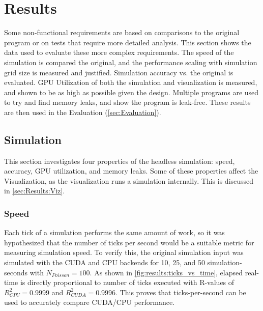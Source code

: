 
\newcommand{\npoisson}{N_{Poisson}}

\chapter{Results}\label{sec:Results}
Some non-functional requirements are based on comparisons to the original program or on tests that require more detailed analysis.
This section shows the data used to evaluate these more complex requirements.
The speed of the simulation is compared the original, and the performance scaling with simulation grid size is measured and justified.
Simulation accuracy vs. the original is evaluated.
GPU Utilization of both the simulation and visualization is measured, and shown to be as high as possible given the design.
Multiple programs are used to try and find memory leaks, and show the program is leak-free.
These results are then used in the Evaluation (\cref{sec:Evaluation}).

\pagebreak
\section{Simulation}
This section investigates four properties of the headless simulation: speed, accuracy, GPU utilization, and memory leaks.
Some of these properties affect the Visualization, as the visualization runs a simulation internally.
This is discussed in \cref{sec:Results:Viz}.

\subsection{Speed}\label{sec:Results:Sim:Speed}



Each tick of a simulation performs the same amount of work, so it was hypothesized that the number of ticks per second would be a suitable metric for measuring simulation speed.
To verify this, the original simulation input was simulated with the CUDA and CPU backends for 10, 25, and 50 simulation-seconds with $\npoisson = 100$.
As shown in \cref{fig:results:ticks_vs_time}, elapsed real-time is directly proportional to number of ticks executed with R-values of $R^2_{CPU} = 0.9999$ and $R^2_{CUDA} = 0.9996$.
This proves that ticks-per-second can be used to accurately compare CUDA/CPU performance.

